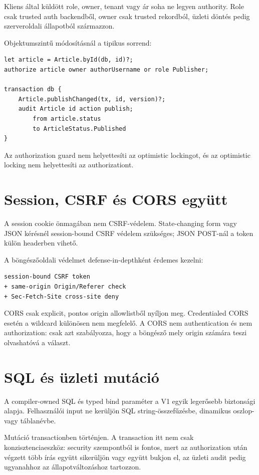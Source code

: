 Kliens által küldött role, owner, tenant vagy ár soha ne legyen authority. Role csak trusted auth backendből, owner csak trusted rekordból, üzleti döntés pedig szerveroldali állapotból származzon.

\Needspace{0.38\textheight}
Objektumszintű módosításnál a tipikus sorrend:

\begin{lstlisting}[language=RWLang]
let article = Article.byId(db, id)?;
authorize article owner authorUsername or role Publisher;

transaction db {
    Article.publishChanged(tx, id, version)?;
    audit Article id action publish;
        from article.status
        to ArticleStatus.Published
}
\end{lstlisting}

Az authorization guard nem helyettesíti az optimistic lockingot, és az optimistic locking nem helyettesíti az authorizationt.

\section{Session, CSRF és CORS együtt}

A session cookie önmagában nem CSRF-védelem. State-changing form vagy JSON kérésnél session-bound CSRF védelem szükséges; JSON POST-nál a token külön headerben vihető.

A böngészőoldali védelmet defense-in-depthként érdemes kezelni:

\begin{lstlisting}
session-bound CSRF token
+ same-origin Origin/Referer check
+ Sec-Fetch-Site cross-site deny
\end{lstlisting}

CORS csak explicit, pontos origin allowlistből nyíljon meg. Credentialed CORS esetén a wildcard különösen nem megfelelő. A CORS nem authentication és nem authorization: csak azt szabályozza, hogy a böngésző mely origin számára teszi olvashatóvá a választ.

\section{SQL és üzleti mutáció}

A compiler-owned SQL és typed bind paraméter a V1 egyik legerősebb biztonsági alapja. Felhasználói input ne kerüljön SQL string-összefűzésbe, dinamikus oszlop- vagy táblanévbe.

Mutáció transactionben történjen. A transaction itt nem csak konzisztenciaeszköz: security szempontból is fontos, mert az authorization után végzett több írás együtt sikerüljön vagy együtt bukjon el, az üzleti audit pedig ugyanahhoz az állapotváltozáshoz tartozzon.

